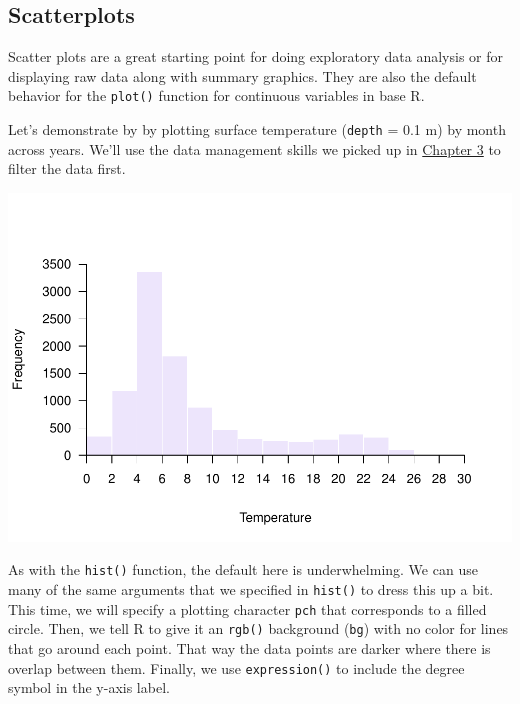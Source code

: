 \documentclass[
]{book}
\newenvironment{Shaded}{\begin{snugshade}}{\end{snugshade}}
\newcommand{\CommentTok}[1]{\textcolor[rgb]{0.56,0.35,0.01}{\textit{#1}}}
\newcommand{\DataTypeTok}[1]{\textcolor[rgb]{0.13,0.29,0.53}{#1}}
\newcommand{\FloatTok}[1]{\textcolor[rgb]{0.00,0.00,0.81}{#1}}
\newcommand{\KeywordTok}[1]{\textcolor[rgb]{0.13,0.29,0.53}{\textbf{#1}}}
\newcommand{\NormalTok}[1]{#1}
\newcommand{\OperatorTok}[1]{\textcolor[rgb]{0.81,0.36,0.00}{\textbf{#1}}}
\newcommand{\StringTok}[1]{\textcolor[rgb]{0.31,0.60,0.02}{#1}}
\begin{document}
\hypertarget{scatterplots}{%
\subsection{Scatterplots}\label{scatterplots}}

Scatter plots are a great starting point for doing exploratory data analysis or for displaying raw data along with summary graphics. They are also the default behavior for the \texttt{plot()} function for continuous variables in base R.

Let's demonstrate by by plotting surface temperature (\texttt{depth} = 0.1 m) by month across years. We'll use the data management skills we picked up in \protect\hyperlink{Chapterux5cux25203}{Chapter 3} to filter the data first.

\begin{Shaded}
\end{Shaded}

\includegraphics{worstr_files/figure-latex/unnamed-chunk-91-1.pdf}

As with the \texttt{hist()} function, the default here is underwhelming. We can use many of the same arguments that we specified in \texttt{hist()} to dress this up a bit. This time, we will specify a plotting character \texttt{pch} that corresponds to a filled circle. Then, we tell R to give it an \texttt{rgb()} background (\texttt{bg}) with no color for lines that go around each point. That way the data points are darker where there is overlap between them. Finally, we use \texttt{expression()} to include the degree symbol in the y-axis label.
\end{document}
